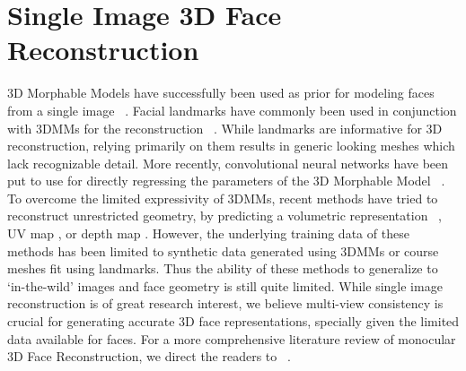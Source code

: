 \section{Single Image 3D Face Reconstruction} 3D Morphable Models have successfully been used as prior for modeling faces from a single image ~\cite{blanz1999morphable, breuer2008automatic, zhu2015high, saito2017photorealistic, jiang20183d, richardson20163d, tuan2017regressing}. Facial landmarks have commonly been used in conjunction with 3DMMs for the reconstruction ~\cite{zhu2015high, aldrian2010linear, kemelmacher20113d, dou2014robust}. While landmarks are informative for 3D reconstruction, relying primarily on them results in generic looking meshes which lack recognizable detail. More recently, convolutional neural networks have been put to use for directly regressing the parameters of the 3D Morphable Model ~\cite{zhu2016face, jourabloo2016large}. To overcome the limited expressivity of 3DMMs, recent methods have tried to reconstruct unrestricted geometry, by predicting  a volumetric representation ~\cite{jackson2017large}, UV map \cite{feng2018joint}, or depth map \cite{sela2017unrestricted}. However, the underlying training data of these methods has been limited to synthetic data generated using 3DMMs or course meshes fit using landmarks. Thus the ability of these methods to generalize to `in-the-wild' images and face geometry is still quite limited. While single image reconstruction is of great research interest, we believe multi-view consistency is crucial for generating accurate 3D face representations, specially given the limited data available for faces.  For a more comprehensive literature review of monocular 3D Face Reconstruction, we direct the readers to ~\cite{zollhofer2018state}.

